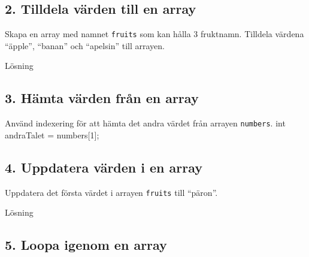 \hypertarget{tilldela-vuxe4rden-till-en-array}{%
\subsection{2. Tilldela värden till en
array}\label{tilldela-vuxe4rden-till-en-array}}

Skapa en array med namnet \texttt{fruits} som kan hålla 3 fruktnamn.
Tilldela värdena ``äpple'', ``banan'' och ``apelsin'' till arrayen.

Lösning

\hypertarget{cb2}{}
\begin{Shaded}
\begin{Highlighting}[]
\OperatorTok{[]}\OperatorTok{=} \OperatorTok{\{}\OperatorTok{,} \OperatorTok{,} \OperatorTok{\};}
\end{Highlighting}
\end{Shaded}

\hypertarget{huxe4mta-vuxe4rden-fruxe5n-en-array}{%
\subsection{3. Hämta värden från en
array}\label{huxe4mta-vuxe4rden-fruxe5n-en-array}}

Använd indexering för att hämta det andra värdet från arrayen
\texttt{numbers}. int andraTalet = numbers{[}1{]};

\hypertarget{uppdatera-vuxe4rden-i-en-array}{%
\subsection{4. Uppdatera värden i en
array}\label{uppdatera-vuxe4rden-i-en-array}}

Uppdatera det första värdet i arrayen \texttt{fruits} till ``päron''.

Lösning

\hypertarget{cb3}{}
\begin{Shaded}
\begin{Highlighting}[]
\OperatorTok{[}\OperatorTok{]} \OperatorTok{=} \OperatorTok{;}
\end{Highlighting}
\end{Shaded}

\hypertarget{loopa-igenom-en-array}{%
\subsection{5. Loopa igenom en array}\label{loopa-igenom-en-array}}

